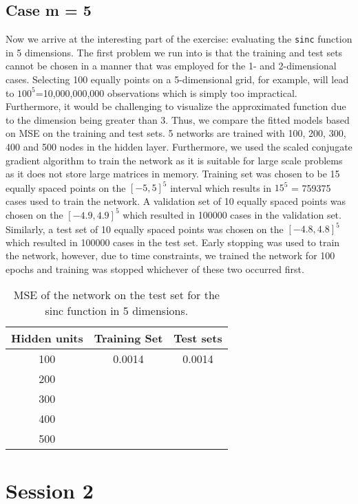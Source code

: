 \documentclass[paper=a4, fontsize=11pt]{scrartcl} %
\numberwithin{equation}{section} %
\begin{document}
\subsection*{Case m = 5}
Now we arrive at the interesting part of the exercise: evaluating the \texttt{sinc} function in 5 dimensions. The first problem we run into is that the training and test sets cannot be chosen in a manner that was employed for the 1- and 2-dimensional cases. Selecting 100 equally points on a 5-dimensional grid, for example, will lead to $100^5$=10,000,000,000 observations which is simply too impractical. Furthermore, it would be challenging to visualize the approximated function due to the dimension being greater than 3. Thus, we compare the fitted models based on MSE on the training and test sets. 5 networks are trained with 100, 200, 300, 400 and 500 nodes in the hidden layer. Furthermore, we used the scaled conjugate gradient algorithm to train the network as it is suitable for large scale problems as it does not store large matrices in memory. Training set was chosen to be 15 equally spaced points on the $[-5,5]^5$ interval which results in $15^5$ = 759375 cases used to train the network. A validation set of 10 equally spaced points was chosen on the $[-4.9,4.9]^5$ which resulted in 100000 cases in the validation set. Similarly, a test set of 10 equally spaced points was chosen on the $[-4.8,4.8]^5$ which resulted in 100000 cases in the test set. Early stopping was used to train the network, however, due to time constraints, we trained the network for 100 epochs and training was stopped whichever of these two occurred first. 

\begin{table}
\centering
\begin{tabular}{|c|c|c|}
\hline
Hidden units & Training Set & Test sets \\ 
\hline
100 & 	0.0014	& 0.0014 \\
\hline
200 & 				& 			\\
\hline
300 & 			& 			\\
\hline
400 & 			&	 \\
\hline
500	& 			&		\\
\hline
\end{tabular}
\caption{MSE of the network on the test set for the sinc function in 5 dimensions.}
\label{sinc5}
\end{table}

\section{Session 2}
\end{document}
